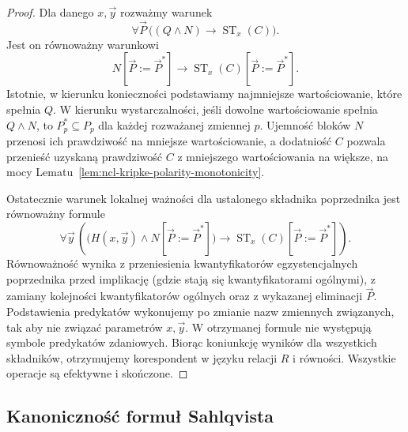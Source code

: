 \begin{proof}
Dla danego $x,\vec y$ rozważmy warunek
\[
 \forall\vec P\,
 \bigl((Q\wedge N)\to\operatorname{ST}_x(C)\bigr).
\]
Jest on równoważny warunkowi
\[
 N[\vec P:=\vec P^*]\to
       \operatorname{ST}_x(C)[\vec P:=\vec P^*].
\]
Istotnie, w kierunku konieczności podstawiamy
najmniejsze wartościowanie, które spełnia $Q$.
W kierunku wystarczalności, jeśli dowolne
wartościowanie spełnia $Q\wedge N$, to
$P_p^*\subseteq P_p$ dla każdej rozważanej zmiennej $p$.
Ujemność bloków $N$ przenosi ich prawdziwość
na mniejsze wartościowanie, a dodatniość
$C$ pozwala przenieść uzyskaną prawdziwość
$C$ z mniejszego wartościowania na większe,
na mocy
Lematu~\ref{lem:ncl-kripke-polarity-monotonicity}.

Ostatecznie warunek lokalnej ważności
dla ustalonego składnika poprzednika
jest równoważny formule
\[
 \forall\vec y\,\left(
  \bigl(H(x,\vec y)\wedge N[\vec P:=\vec P^*]\bigr)
  \to \operatorname{ST}_x(C)[\vec P:=\vec P^*]\right).
\]
Równoważność wynika z przeniesienia
kwantyfikatorów egzystencjalnych poprzednika
przed implikację (gdzie stają się kwantyfikatorami
ogólnymi), z zamiany kolejności kwantyfikatorów
ogólnych oraz z wykazanej eliminacji $\vec P$.
Podstawienia predykatów wykonujemy po
zmianie nazw zmiennych związanych,
tak aby nie związać parametrów $x,\vec y$.
W otrzymanej formule nie występują symbole
predykatów zdaniowych. Biorąc koniunkcję
wyników dla wszystkich składników,
otrzymujemy korespondent w języku
relacji $R$ i równości.
Wszystkie operacje są efektywne i skończone.
\end{proof}


\subsection{Kanoniczność formuł Sahlqvista}

